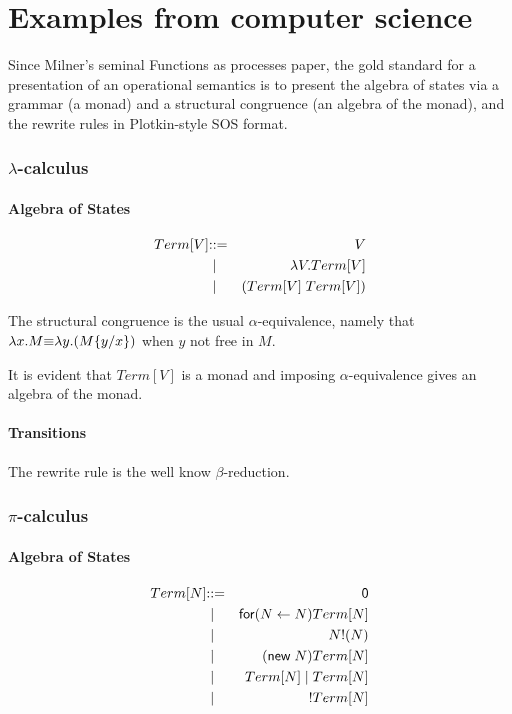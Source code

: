 \section{Examples from computer science}
Since Milner's seminal Functions as processes paper, the gold standard for a presentation of an operational semantics is to present the algebra of states via a grammar (a monad) and a structural congruence (an algebra of the monad), and the rewrite rules in Plotkin-style SOS format.

\subsubsection{$\lambda$-calculus}

\paragraph{Algebra of States}
\begin{eqnarray*}
  Term[V] & \bc & V \\
  & \;\bm\; & \lambda V.Term[V] \\
  & \;\bm\; & \mathsf{(} Term[V] \; Term[V] \mathsf{)}
\end{eqnarray*}

The structural congruence is the usual $\alpha$-equivalence, namely that $\lambda x.M \scong \lambda y.(M\{y / x\})$ when $y$ not free in $M$.

It is evident that $Term[V]$ is a monad and imposing $\alpha$-equivalence gives an algebra of the monad.

\paragraph{Transitions}
The rewrite rule is the well know $\beta$-reduction.
\begin{mathpar}
\end{mathpar}

\subsubsection{$\pi$-calculus}

\paragraph{Algebra of States}
\begin{eqnarray*}
  Term[N] & \bc & \mathsf{0} \\
  & \;\bm\; & \mathsf{for}\mathsf{(}N \leftarrow N\mathsf{)}Term[N] \\
  & \;\bm\; & N\mathsf{!}\mathsf{(}N\mathsf{)} \\
  & \;\bm\; & \mathsf{(}\mathsf{new}\; N\mathsf{)}Term[N] \\
  & \;\bm\; & Term[N] \; \mathsf{|}\; Term[N] \\
  & \;\bm\; & \mathsf{!}Term[N]
\end{eqnarray*}

